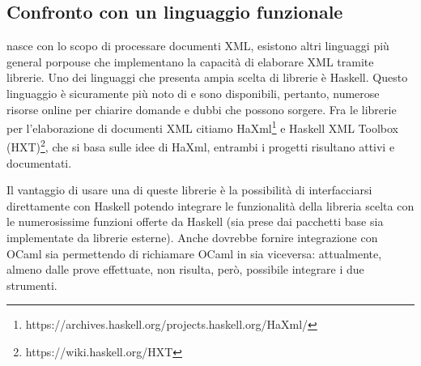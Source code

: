 \subsection{Confronto con un linguaggio funzionale}
\cduce nasce con lo scopo di processare documenti XML, esistono altri linguaggi più general porpouse che implementano la capacità di elaborare XML tramite librerie. Uno dei linguaggi che presenta ampia scelta di librerie è Haskell. Questo linguaggio è sicuramente più noto di \cduce e sono disponibili, pertanto, numerose risorse online per chiarire domande e dubbi che possono sorgere. Fra le librerie per l'elaborazione di documenti XML citiamo HaXml\footnote{https://archives.haskell.org/projects.haskell.org/HaXml/} e Haskell XML Toolbox (HXT)\footnote{https://wiki.haskell.org/HXT}, che si basa sulle idee di HaXml, entrambi i progetti risultano attivi e documentati.

Il vantaggio di usare una di queste librerie è la possibilità di interfacciarsi direttamente con Haskell potendo integrare le funzionalità della libreria scelta con le numerosissime funzioni offerte da Haskell (sia prese dai pacchetti base sia implementate da librerie esterne). Anche \cduce dovrebbe fornire integrazione con OCaml sia permettendo di richiamare OCaml in \cduce sia viceversa: attualmente, almeno dalle prove effettuate, non risulta, però, possibile integrare i due strumenti.
